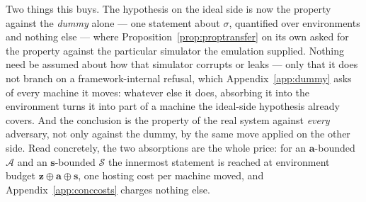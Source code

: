 \documentclass[11pt,a4paper]{article}
\newcommand{\Adv}{\mathcal{A}}
\newcommand{\Sim}{\mathcal{S}}
\newcommand{\bd}[1]{\mathbf{#1}}
\theoremstyle{accentdef}
\theoremstyle{accentplain}
\begin{document}
Two things this buys. The hypothesis on the ideal side is now the property against the \emph{dummy}
alone --- one statement about $\sigma$, quantified over environments and nothing else --- where
Proposition~\ref{prop:proptransfer} on its own asked for the property against the particular simulator
the emulation supplied. Nothing need be assumed about how that simulator corrupts or leaks --- only that
it does not branch on a framework-internal refusal, which Appendix~\ref{app:dummy} asks of every
machine it moves: whatever else it does, absorbing it into the environment turns it into part of a
machine the ideal-side hypothesis already covers. And the conclusion is the property of the real system
against \emph{every} adversary, not only against the dummy, by the same move applied on the other side.
Read concretely, the two absorptions are the whole price: for an $\bd{a}$-bounded $\Adv$ and an
$\bd{s}$-bounded $\Sim$ the innermost statement is reached at environment
budget $\bd{z} \oplus \bd{a} \oplus \bd{s}$, one hosting cost per machine moved, and
Appendix~\ref{app:conccosts} charges nothing else.
\end{document}
